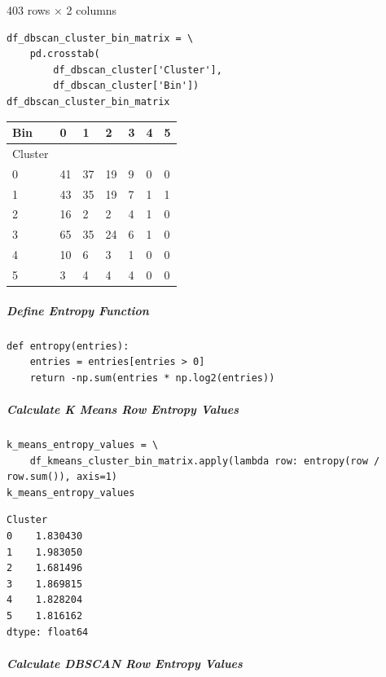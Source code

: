\bigskip

403 rows $\times$ 2 columns

\begin{verbatim}
df_dbscan_cluster_bin_matrix = \
    pd.crosstab(
        df_dbscan_cluster['Cluster'], 
        df_dbscan_cluster['Bin'])
df_dbscan_cluster_bin_matrix
\end{verbatim}

\bigskip\noindent
\begin{tabular}{p{}p{}p{}p{}p{}p{}p{}}
\toprule
Bin & 0 & 1 & 2 & 3 & 4 & 5 \\
\hline
Cluster &  &  &  &  &  &  \\
\hline
0 & 41 & 37 & 19 & 9 & 0 & 0 \\
\hline
1 & 43 & 35 & 19 & 7 & 1 & 1 \\
\hline
2 & 16 & 2 & 2 & 4 & 1 & 0 \\
\hline
3 & 65 & 35 & 24 & 6 & 1 & 0 \\
\hline
4 & 10 & 6 & 3 & 1 & 0 & 0 \\
\hline
5 & 3 & 4 & 4 & 4 & 0 & 0 \\
\hline
\bottomrule
\end{tabular}

\bigskip

\subparagraph{Define Entropy Function}

\begin{verbatim}
def entropy(entries):
    entries = entries[entries > 0]
    return -np.sum(entries * np.log2(entries))
\end{verbatim}

\subparagraph{Calculate K Means Row Entropy Values}

\begin{verbatim}
k_means_entropy_values = \
    df_kmeans_cluster_bin_matrix.apply(lambda row: entropy(row / row.sum()), axis=1)
k_means_entropy_values
\end{verbatim}

\begin{verbatim}
Cluster
0    1.830430
1    1.983050
2    1.681496
3    1.869815
4    1.828204
5    1.816162
dtype: float64
\end{verbatim}

\subparagraph{Calculate DBSCAN Row Entropy Values}

